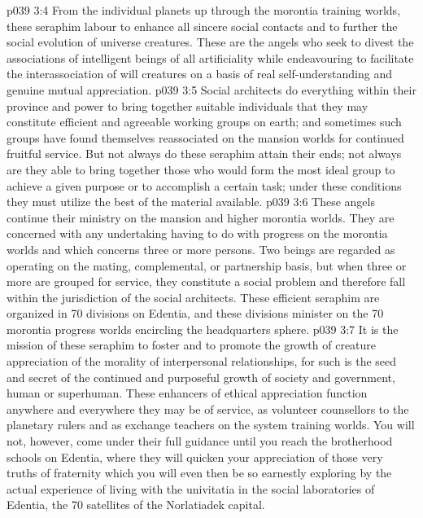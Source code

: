 \vs p039 3:4 \bibnobreakspace {} From the individual planets up through the morontia training worlds, these seraphim labour to enhance all sincere social contacts and to further the social evolution of universe creatures. These are the angels who seek to divest the associations of intelligent beings of all artificiality while endeavouring to facilitate the interassociation of will creatures on a basis of real self\hyp{}understanding and genuine mutual appreciation.
\vs p039 3:5 Social architects do everything within their province and power to bring together suitable individuals that they may constitute efficient and agreeable working groups on earth; and sometimes such groups have found themselves reassociated on the mansion worlds for continued fruitful service. But not always do these seraphim attain their ends; not always are they able to bring together those who would form the most ideal group to achieve a given purpose or to accomplish a certain task; under these conditions they must utilize the best of the material available.
\vs p039 3:6 These angels continue their ministry on the mansion and higher morontia worlds. They are concerned with any undertaking having to do with progress on the morontia worlds and which concerns three or more persons. Two beings are regarded as operating on the mating, complemental, or partnership basis, but when three or more are grouped for service, they constitute a social problem and therefore fall within the jurisdiction of the social architects. These efficient seraphim are organized in 70 divisions on Edentia, and these divisions minister on the 70 morontia progress worlds encircling the headquarters sphere.
\vs p039 3:7 \bibnobreakspace {} It is the mission of these seraphim to foster and to promote the growth of creature appreciation of the morality of interpersonal relationships, for such is the seed and secret of the continued and purposeful growth of society and government, human or superhuman. These enhancers of ethical appreciation function anywhere and everywhere they may be of service, as volunteer counsellors to the planetary rulers and as exchange teachers on the system training worlds. You will not, however, come under their full guidance until you reach the brotherhood schools on Edentia, where they will quicken your appreciation of those very truths of fraternity which you will even then be so earnestly exploring by the actual experience of living with the univitatia in the social laboratories of Edentia, the 70 satellites of the Norlatiadek capital.
